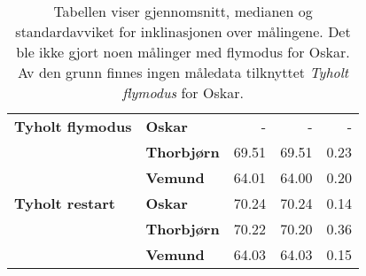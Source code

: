 \begin{table}[]
\begin{tabular}{llrrr}
    \textbf{Tyholt flymodus}                & \textbf{Oskar}                       & -                                                                           & -                                                                     & -                                                                            \\
                                            & \textbf{Thorbjørn}                   & 69.51                                                                       & 69.51                                                                 & 0.23                                                                         \\
                                            & \textbf{Vemund}                      & 64.01                                                                       & 64.00                                                                 & 0.20                                                                         \\
    \rowcolor[HTML]{C0C0C0} 
    \textbf{Tyholt restart}                 & \textbf{Oskar}                       & 70.24                                                                       & 70.24                                                                 & 0.14                                                                         \\
    \rowcolor[HTML]{C0C0C0} 
                                            & \textbf{Thorbjørn}                   & 70.22                                                                       & 70.20                                                                 & 0.36                                                                         \\
    \rowcolor[HTML]{C0C0C0} 
                                            & \textbf{Vemund}                      & 64.03                                                                       & 64.03                                                                 & 0.15                                                                        
    \end{tabular}
    \caption{Tabellen viser gjennomsnitt, medianen og standardavviket for inklinasjonen over målingene. Det ble ikke gjort noen målinger med flymodus for Oskar. Av den grunn finnes ingen måledata tilknyttet \textit{Tyholt flymodus} for Oskar.}
\end{table}